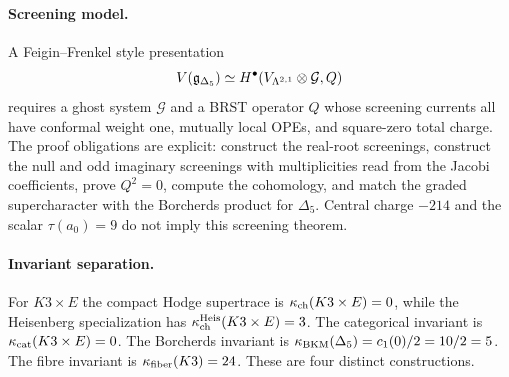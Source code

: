 \paragraph{Screening model.}
A Feigin--Frenkel style presentation
\[
  V(\mathfrak{g}_{\Delta_5}) \simeq H^\bullet(V_{\Lambda^{2,1}}\otimes \mathcal G,Q)
\]
requires a ghost system $\mathcal G$ and a BRST operator $Q$ whose
screening currents all have conformal weight one, mutually local OPEs,
and square-zero total charge. The proof obligations are explicit:
construct the real-root screenings, construct the null and odd
imaginary screenings with multiplicities read from the Jacobi
coefficients, prove $Q^2=0$, compute the cohomology, and match the
graded supercharacter with the Borcherds product for $\Delta_5$.
Central charge $-214$ and the scalar $\tau(a_0)=9$ do not imply this
screening theorem.

\paragraph{Invariant separation.}
For $K3\times E$ the compact Hodge supertrace is
$\kappa_{\mathrm{ch}}(K3\times E)=0$, while the Heisenberg specialization has
$\kappa_{\mathrm{ch}}^{\mathrm{Heis}}(K3\times E)=3$. The categorical invariant is
$\kappa_{\mathrm{cat}}(K3\times E)=0$. The Borcherds invariant is
$\kappa_{\mathrm{BKM}}(\Delta_5)=c_1(0)/2=10/2=5$. The fibre invariant is
$\kappa_{\mathrm{fiber}}(K3)=24$. These are four distinct constructions.
